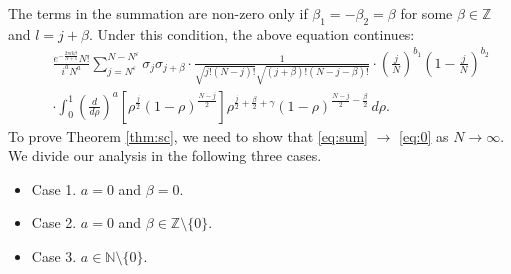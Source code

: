\documentclass[12pt,reqno]{amsart}
\newcommand\N{\mathbb{N}}
\newcommand\ve{\varepsilon}
\newcommand\Z{\mathbb{Z}}
\theoremstyle{plain}
\theoremstyle{remark}
\numberwithin{equation}{section}
\begin{document}
The terms in the summation are non-zero only if $\beta_1=-\beta_2=\beta$ for some $\beta\in\Z$ and $l=j+\beta$. Under this condition, the above equation continues:
\begin{eqnarray}
&&\frac{e^{-\frac{2\pi ik\beta}{N+1}}N!}{i^aN^a}\sum_{j=N^\ve}^{N-N^\ve}\sigma_j\sigma_{j+\beta}\cdot\frac{1}{\sqrt{j!(N-j)!}\sqrt{(j+\beta)!(N-j-\beta)!}}\cdot\left(\frac jN\right)^{b_1}\left(1-\frac jN\right)^{b_2}\nonumber\\
&&\cdot\int_0^1\left(\frac{d}{d\rho}\right)^a\left[\rho^\frac j2(1-\rho)^{\frac{N-j}{2}}\right]\rho^{\frac j2+\frac\beta2+\gamma}(1-\rho)^{\frac{N-j}{2}-\frac\beta2}\,d\rho.\label{eq:sum}
\end{eqnarray}
To prove Theorem \ref{thm:sc}, we need to show that \eqref{eq:sum} $\to$ \eqref{eq:0} as $N\to\infty$. We divide our analysis in the following three cases.
\begin{itemize}
\item Case 1. $a=0$ and $\beta=0$.
\item Case 2. $a=0$ and $\beta\in\Z\setminus\{0\}$.
\item Case 3. $a\in\N\setminus\{0\}$.
\end{itemize}
\end{document}
